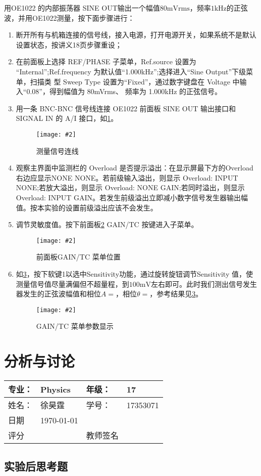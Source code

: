 \documentclass[11pt,a4paper]{ctexart}
\newcommand{\cpic}[2]{
\begin{center}
\texttt{[image: \#2]}
\end{center}
}
\newcommand{\cpicn}[3]
{
\begin{figure}[H]
\cpic{#1}{#2}
\caption{#3\label{#2}}
\end{figure}
}
\begin{document}
\par
用OE1022 的内部振荡器 SINE OUT输出一个幅值$80\mathrm{mVrms}$，频率$1\mathrm{kHz}$的正弦波，并用OE1022测量，按下面步骤进行：
\begin{enumerate}
\item 断开所有与机箱连接的信号线，接入电源，打开电源开关，如果系统不是默认设置状态，按讲义18页步骤重设；
\item 在前面板上选择 REF/PHASE 子菜单，Ref.source 设置为 “Internal”;Ref.frequency 为默认值“1.000kHz”;选择进入“Sine Output”下级菜单，扫描类 型 Sweep Type 设置为“Fixed”，通过数字键盘在 Voltage 中输入“0.08”，得到幅值为 80mVrms、 频率为 1.000kHz 的正弦信号。
\item 用一条 BNC-BNC 信号线连接 OE1022 前面板 SINE OUT 输出接口和 SIGNAL IN 的 A/I
 接口，如\cref{d112}。
 \cpicn{0.6}{d112}{测量信号连线}
 \item 观察主界面中监测栏的 Overload 是否提示溢出：在显示屏最下方的Overload右边应显示NONE NONE。若前级输入溢出，则显示 Overload: INPUT NONE;若放大溢出，则显示 Overload: NONE GAIN;若同时溢出，则显示 Overload: INPUT GAIN。若发生前级溢出立即减小数字信号发生器输出幅值。按本实验的设置前级溢出应该不会发生。
 \item 调节灵敏度值。按下前面板\cref{d114} GAIN/TC 按键进入子菜单。
 \cpicn{0.6}{d114}{前面板GAIN/TC 菜单位置}
 \item 如\cref{d115}，按下软键1以选中Sensitivity功能，通过旋转旋钮调节Sensitivity 值，使测量信号值尽量满偏但不超量程，到$100\mathrm{mV}$左右即可。此时我们测出信号发生器发生的正弦波幅值和相位$A=$\uline{\hspace{2cm}}，相位$\theta = $\uline{\hspace{2cm}}，参考结果见\cref{d115}。
 \cpicn{0.6}{d115}{GAIN/TC 菜单参数显示}


\end{enumerate}

\newpage
\section{分析与讨论}
\begin{tabular}{|p{7em}|p{7em}|p{7em}|p{7em}|}
	\hline 
	专业：     &Physics       &年级：      & 17     \\
	\hline
	姓名：& 徐昊霆 &学号：&17353071  \\
	\hline
	日期&  \today              & &  \\
	\hline	
	评分 & & 教师签名 & \\
	\hline
\end{tabular}


\subsection{实验后思考题}



\end{document}

